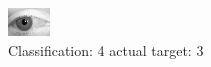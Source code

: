 \begin{figure}[h!]
\begin{center}
\includegraphics[width=0.60\columnwidth]{figures/ID2809_class_4_target_3.png}
\end{center}
\caption{ Classification: 4 actual target: 3}
\label{fig:ID2809_class_4_target_3}
\end{figure}

